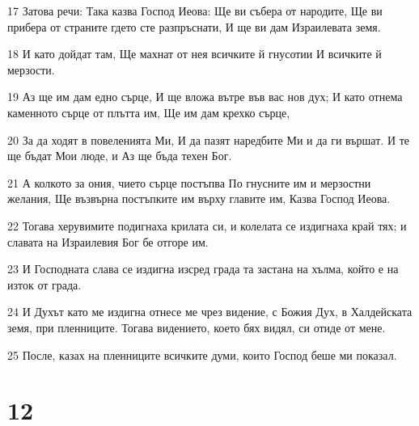 \par 17 Затова речи: Така казва Господ Иеова: Ще ви събера от народите, Ще ви прибера от страните гдето сте разпръснати, И ще ви дам Израилевата земя.
\par 18 И като дойдат там, Ще махнат от нея всичките й гнусотии И всичките й мерзости.
\par 19 Аз ще им дам едно сърце, И ще вложа вътре във вас нов дух; И като отнема каменното сърце от плътта им, Ще им дам крехко сърце,
\par 20 За да ходят в повеленията Ми, И да пазят наредбите Ми и да ги вършат. И те ще бъдат Мои люде, и Аз ще бъда техен Бог.
\par 21 А колкото за ония, чието сърце постъпва По гнусните им и мерзостни желания, Ще възвърна постъпките им върху главите им, Казва Господ Иеова.
\par 22 Тогава херувимите подигнаха крилата си, и колелата се издигнаха край тях; и славата на Израилевия Бог бе отгоре им.
\par 23 И Господната слава се издигна изсред града та застана на хълма, който е на изток от града.
\par 24 И Духът като ме издигна отнесе ме чрез видение, с Божия Дух, в Халдейската земя, при пленниците. Тогава видението, което бях видял, си отиде от мене.
\par 25 После, казах на пленниците всичките думи, които Господ беше ми показал.

\chapter{12}

